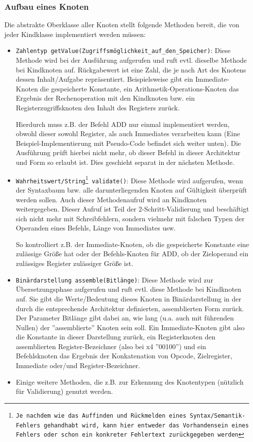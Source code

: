 \subsubsection{Aufbau eines Knoten}
Die abstrakte Oberklasse aller Knoten stellt folgende Methoden bereit, die von jeder Kindklasse implementiert werden müssen:
\begin{itemize}
	\item \texttt{Zahlentyp getValue(Zugriffsmöglichkeit\_auf\_den\_Speicher)}: Diese Methode wird bei der Ausführung aufgerufen und ruft evtl. dieselbe Methode bei Kindknoten auf. Rückgabewert ist eine Zahl, die je nach Art des Knotens dessen Inhalt/Aufgabe repräsentiert. Beispielsweise gibt ein Immediate-Knoten die gespeicherte Konstante, ein Arithmetik-Operations-Knoten das Ergebnis der Rechenoperation mit den Kindknoten bzw. ein Registerzugriffsknoten den Inhalt des Registers zurück.

	Hierdurch muss z.B. der Befehl ADD nur einmal implementiert werden, obwohl dieser sowohl Register, als auch Immediates verarbeiten kann (Eine Beispiel-Implementierung mit Pseudo-Code befindet sich weiter unten). Die Ausführung prüft hierbei nicht mehr, ob dieser Befehl in dieser Architektur und Form so erlaubt ist. Dies geschieht separat in der nächsten Methode.

	\item \texttt{Wahrheitswert/String\footnote{Je nachdem wie das Auffinden und Rückmelden eines Syntax/Semantik-Fehlers gehandhabt wird, kann hier entweder das Vorhandensein eines Fehlers oder schon ein konkreter Fehlertext zurückgegeben werden} validate()}: Diese Methode wird aufgerufen, wenn der Syntaxbaum bzw. alle darunterliegenden Knoten auf Gültigkeit überprüft werden sollen. Auch dieser Methodenaufruf wird an Kindknoten weitergegeben. Dieser Aufruf ist Teil der 2-Schritt-Validierung und beschäftigt sich nicht mehr mit Schreibfehlern, sondern vielmehr mit falschen Typen der Operanden eines Befehls, Länge von Immediates usw.

	So kontrolliert z.B. der Immediate-Knoten, ob die gespeicherte Konstante eine zulässige Größe hat oder der Befehls-Knoten für ADD, ob der Zieloperand ein zulässiges Register zulässiger Größe ist.
	
	\item \texttt{Binärdarstellung assemble(Bitlänge)}: Diese Methode wird zur Übersetzungsphase aufgerufen und ruft evtl. diese Methode bei Kindknoten auf. Sie gibt die Werte/Bedeutung dieses Knoten in Binärdarstellung in der durch die entsprechende Architektur definierten, assemblierten Form zurück. Der Parameter Bitlänge gibt dabei an, wie lang (u.a. auch mit führenden Nullen) der ''assemblierte'' Knoten sein soll. Ein Immediate-Knoten gibt also die Konstante in dieser Darstellung zurück, ein Registerknoten den assemblierten Register-Bezeichner (also bei x4 ''00100'') und ein Befehlsknoten das Ergebnis der Konkatenation von Opcode, Zielregister, Immediate oder/und Register-Bezeichner. 

	\item Einige weitere Methoden, die z.B. zur Erkennung des Knotentypen (nützlich für Validierung) genutzt werden.
\end{itemize}
